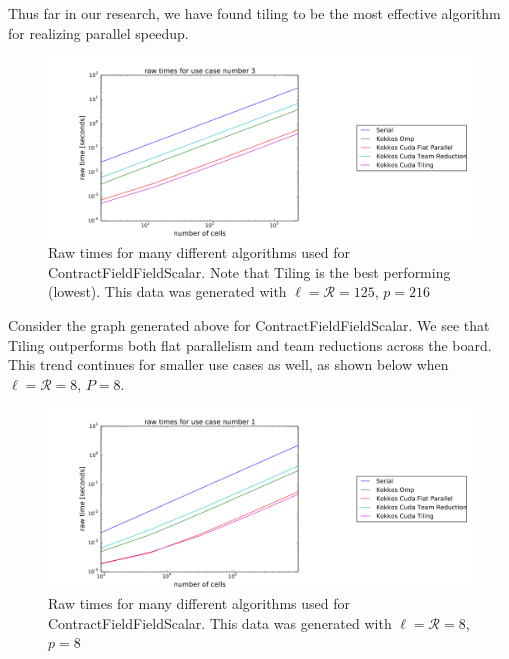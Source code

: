 Thus far in our research, we have found tiling to be the most effective algorithm for realizing parallel speedup. 

\begin{figure}[H]
    \centering
\includegraphics[scale = .2]{tilinguc1}
\caption{Raw times for many different algorithms used for ContractFieldFieldScalar. Note that Tiling is the best performing (lowest). This data was generated with $\ell=\mathcal{R}=125$, $p=216$}
\end{figure}
Consider the graph generated above for ContractFieldFieldScalar. We see that Tiling outperforms both flat parallelism and team reductions across the board. This trend continues for smaller use cases as well, as shown below when $\ell = \mathcal{R} = 8$, $P = 8$.

\begin{figure}[H]
    \centering
\includegraphics[scale = .2]{tilinguc2}
\caption{Raw times for many different algorithms used for ContractFieldFieldScalar. This data was generated with $\ell=\mathcal{R}=8$, $p=8$}
\end{figure}

